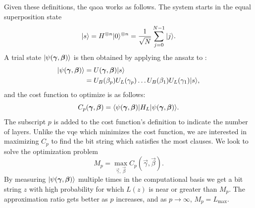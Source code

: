 Given these definitions, the \gls{qaoa} works as follows.
The system starts in the equal superposition state
\begin{equation}
\vert{s}\rangle = H^{\otimes n}\vert{0}\rangle^{\otimes n} = \frac{1}{\sqrt{N}} \sum_{j=0}^{N-1} \vert{j}\rangle.
\end{equation}
A trial state $\vert{\psi(\bm{\gamma}, \bm{\beta})}\rangle$ is then obtained by applying the ansatz to :
\begin{align}
\vert{\psi(\bm{\gamma}, \bm{\beta})}\rangle &= U(\bm{\gamma}, \bm{\beta})\vert{s}\rangle \\
&= U_B(\beta_p)U_L(\gamma_p) \ldots U_B(\beta_1)U_L(\gamma_1)\vert{s}\rangle,
\end{align}
and the cost function to optimize is as follows:
\begin{equation} 
C_p(\bm{\gamma}, \bm{\beta}) = \langle{\psi(\bm{\gamma}, \bm{\beta})}\vert H_L\vert{\psi(\bm{\gamma}, \bm{\beta})}\rangle.
\end{equation}
The subscript $p$ is added to the cost function's definition to indicate the number of layers.
Unlike the \gls{vqe} which minimizes the cost function, we are interested in maximizing $C_p$ to find the bit string which satisfies the most clauses.
We look to solve the optimization problem
\begin{equation}
M_p = \max_{\vec{\gamma}, \, \vec{\beta}} C_p(\vec{\gamma}, \vec{\beta}).
\end{equation}
By measuring $\vert{\psi(\bm{\gamma}, \bm{\beta})}\rangle$ multiple times in the computational basis we get a bit string $z$ with high probability for which $L(z)$ is near or greater than $M_p$.
The approximation ratio gets better as $p$ increases, and as $p \to \infty$, $M_p = L_{\text{max}}$.
